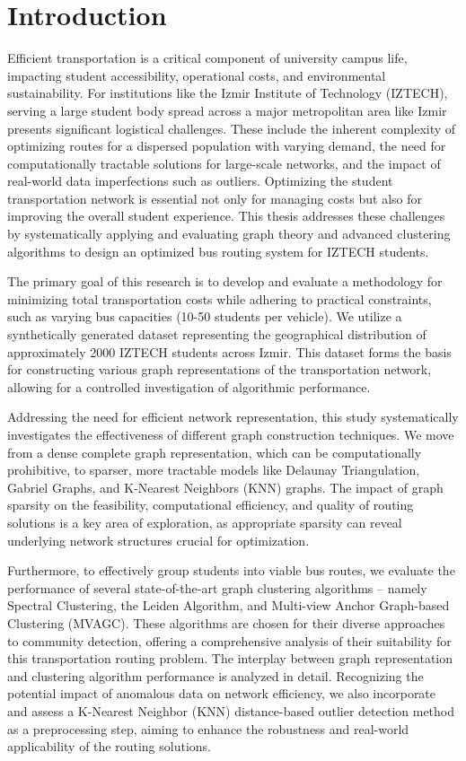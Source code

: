 \chapter{Introduction}
\label{ch:introduction} %

Efficient transportation is a critical component of university campus life, impacting student accessibility, operational costs, and environmental sustainability. For institutions like the Izmir Institute of Technology (IZTECH), serving a large student body spread across a major metropolitan area like Izmir presents significant logistical challenges. These include the inherent complexity of optimizing routes for a dispersed population with varying demand, the need for computationally tractable solutions for large-scale networks, and the impact of real-world data imperfections such as outliers. Optimizing the student transportation network is essential not only for managing costs but also for improving the overall student experience. This thesis addresses these challenges by systematically applying and evaluating graph theory and advanced clustering algorithms to design an optimized bus routing system for IZTECH students.

The primary goal of this research is to develop and evaluate a methodology for minimizing total transportation costs while adhering to practical constraints, such as varying bus capacities (10-50 students per vehicle). We utilize a synthetically generated dataset representing the geographical distribution of approximately 2000 IZTECH students across Izmir. This dataset forms the basis for constructing various graph representations of the transportation network, allowing for a controlled investigation of algorithmic performance.

Addressing the need for efficient network representation, this study systematically investigates the effectiveness of different graph construction techniques. We move from a dense complete graph representation, which can be computationally prohibitive, to sparser, more tractable models like Delaunay Triangulation, Gabriel Graphs, and K-Nearest Neighbors (KNN) graphs. The impact of graph sparsity on the feasibility, computational efficiency, and quality of routing solutions is a key area of exploration, as appropriate sparsity can reveal underlying network structures crucial for optimization.

Furthermore, to effectively group students into viable bus routes, we evaluate the performance of several state-of-the-art graph clustering algorithms – namely Spectral Clustering, the Leiden Algorithm, and Multi-view Anchor Graph-based Clustering (MVAGC). These algorithms are chosen for their diverse approaches to community detection, offering a comprehensive analysis of their suitability for this transportation routing problem. The interplay between graph representation and clustering algorithm performance is analyzed in detail. Recognizing the potential impact of anomalous data on network efficiency, we also incorporate and assess a K-Nearest Neighbor (KNN) distance-based outlier detection method as a preprocessing step, aiming to enhance the robustness and real-world applicability of the routing solutions.


